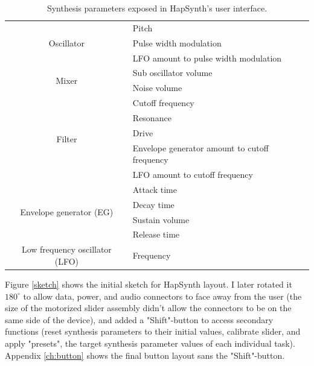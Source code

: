\begin{table}[h]
	\centering
	\begin{tabularx}{\textwidth}{|c|X|}
		\hline
		\thead{Group} & \thead{Parameter} \\
		\hline
		\multirow{3}{*}{Oscillator}
			& Pitch \\\cline{2-2}
			& Pulse width modulation \\\cline{2-2}
			& LFO amount to pulse width modulation \\
		\hline
		\multirow{2}{*}{Mixer}
			& Sub oscillator volume \\\cline{2-2}
			& Noise volume \\
		\hline
		\multirow{5}{*}{Filter}
			& Cutoff frequency \\\cline{2-2}
			& Resonance \\\cline{2-2}
			& Drive \\\cline{2-2}
			& Envelope generator amount to cutoff frequency \\\cline{2-2}
			& LFO amount to cutoff frequency \\
		\hline
		\multirow{4}{*}{Envelope generator (EG)}
			& Attack time \\\cline{2-2}
			& Decay time \\\cline{2-2}
			& Sustain volume \\\cline{2-2}
			& Release time \\
		\hline
		\multirow{1}{*}{Low frequency oscillator (LFO)}
			& Frequency \\
		\hline
	\end{tabularx}
	\caption{Synthesis parameters exposed in HapSynth's user interface.}
	\label{parameters}
\end{table}

Figure \ref{sketch} shows the initial sketch for HapSynth layout. I later rotated it $180^\circ$ to allow data, power, and audio connectors to face away from the user (the size of the motorized slider assembly didn't allow the connectors to be on the same side of the device), and added a "Shift"-button to access secondary functions (reset synthesis parameters to their initial values, calibrate slider, and apply "presets", the target synthesis parameter values of each individual task). Appendix \ref{ch:button} shows the final button layout sans the "Shift"-button.

